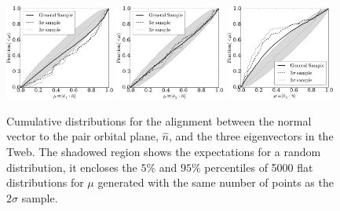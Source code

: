 \documentclass{emulateapj}
\begin{document}
\begin{figure}
\begin{center}
  \includegraphics[width=0.32\textwidth]{fig3a.pdf}
  \includegraphics[width=0.32\textwidth]{fig3b.pdf}
  \includegraphics[width=0.32\textwidth]{fig3c.pdf}
\end{center}
\caption{Cumulative distributions for the alignment between the normal
  vector to the pair orbital plane, $\hat{n}$, and the three eigenvectors in
  the Tweb. The shadowed region shows the expectations for a random
  distribution, it encloses the $5\%$ and $95\%$ percentiles of 5000
  flat distributions for $\mu$ generated with the  same number of
  points as the $2\sigma$ sample.  
    \label{fig:alignment_n}}  
\end{figure}
\end{document}
